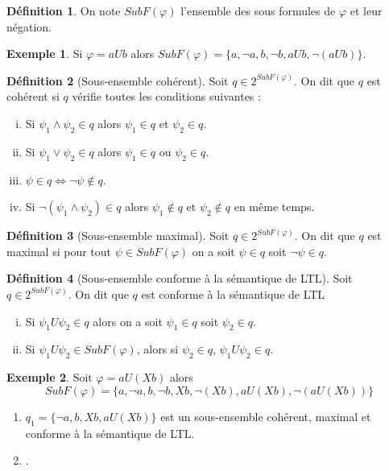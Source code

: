 \documentclass[12pt,a4paper]{article}
\theoremstyle{plain}
\theoremstyle{definition}
\newtheorem{defi}{Définition}
\newtheorem{ex}{Exemple}
\begin{document}
\begin{defi}
  On note $SubF(\varphi)$ l'ensemble des sous formules de $\varphi$ et leur négation.  
\end{defi}

\begin{ex}
  Si $\varphi = a U b$ alors $SubF(\varphi) = \{ a, \lnot a, b, \lnot b, a U b, \lnot(a U b)\}$.
\end{ex}

\begin{defi}[Sous-ensemble cohérent]
  Soit $q \in 2^{SubF(\varphi)}$. On dit que $q$ est cohérent si $q$ vérifie toutes les conditions suivantes :
  \begin{enumerate}[(i)]
  \item Si $\psi_1 \land \psi_2 \in q$ alors $\psi_1 \in q$ et $\psi_2 \in q$.
  \item Si $\psi_1 \lor \psi_2 \in q$ alors $\psi_1 \in q$ ou $\psi_2 \in q$.
  \item $\psi \in q \iff \lnot \psi \not\in q$.
  \item Si $\lnot (\psi_1 \land \psi_2) \in q$ alors $\psi_1 \not \in q$ et $\psi_2 \not \in q$ en même temps.
  \end{enumerate}
\end{defi}

\begin{defi}[Sous-ensemble maximal]
  Soit $q \in 2^{SubF(\varphi)}$. On dit que $q$ est maximal si pour tout $\psi \in SubF(\varphi)$ on a soit $\psi \in q$ soit $\lnot \psi \in q$.  
\end{defi}

\begin{defi}[Sous-ensemble conforme à la sémantique de LTL]
  Soit $q \in 2^{SubF(\varphi)}$. On dit que $q$ est conforme à la sémantique de LTL
  \begin{enumerate}[(i)]
  \item Si $\psi_1 U \psi_2 \in q$ alors on a soit $\psi_1 \in q$ soit $\psi_2 \in q$.
  \item Si $\psi_1 U \psi_2 \in SubF(\varphi)$, alors si $\psi_2 \in q$, $\psi_1 U \psi_2 \in q$.
  \end{enumerate}
\end{defi}

\begin{ex}
  Soit $\varphi = a U (Xb)$ alors
  \[
    SubF(\varphi) = \{a, \lnot a, b, \lnot b, Xb, \lnot (Xb), a U (Xb), \lnot (aU(Xb))\}
  \]
  \begin{enumerate}
  \item $q_1 = \{\lnot a, b, Xb, a U (Xb)\}$ est un sous-ensemble cohérent, maximal et conforme à la sémantique de LTL.
  \item $ $.
  \end{enumerate}
\end{ex}
\end{document}
